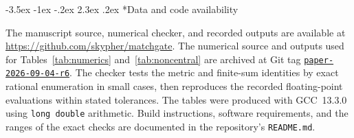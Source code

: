 \documentclass[twoside,10pt]{article}
\makeatletter
\numberwithin{equation}{section}
\theoremstyle{slbody}
\theoremstyle{definition}
\theoremstyle{remark}
\newcommand{\1}{\mathbf{1}}
\renewcommand{\section}{%
  \@startsection{section}{1}{\z@}%
    {-3.5ex \@plus -1ex \@minus -.2ex}%
    {2.3ex \@plus .2ex}%
    {\normalfont\large\bfseries}}
\makeatother
\begin{document}
\section*{Data and code availability}

The manuscript source, numerical checker, and recorded outputs are available
at \url{https://github.com/skypher/matchgate}.  The numerical source and
outputs used for Tables~\ref{tab:numerics} and~\ref{tab:noncentral} are
archived at Git tag
\href{https://github.com/skypher/matchgate/tree/paper-2026-09-04-r6}%
{\texttt{paper-2026-09-04-r6}}.  The checker tests the metric and finite-sum
identities by exact rational enumeration in small cases, then reproduces the
recorded floating-point evaluations within stated tolerances.  The tables
were produced with GCC~13.3.0 using \texttt{long double} arithmetic.
Build instructions, software requirements, and the ranges of the exact checks
are documented in the repository's \texttt{README.md}.
\end{document}

